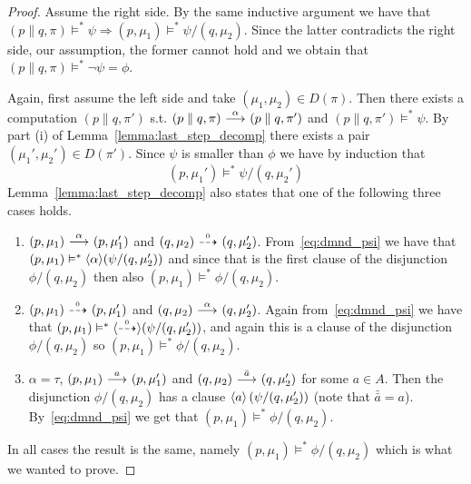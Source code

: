 \begin{proof}
    \rtl Assume the right side. By the same inductive argument we have that
    $(p \parallel q, \pi) \vDash^* \psi \Rightarrow (p,\mu_1) \vDash^* \psi / (q,\mu_2)$.
    Since the latter contradicts the right side, our assumption, the former cannot hold
    and we obtain that $(p \parallel q, \pi) \vDash^* \neg\psi = \phi$.



    \ltr Again, first assume the left side and take $(\mu_1,\mu_2)\in D(\pi)$. Then
    there exists a computation $(p\parallel q, \pi')$ s.t. $(p\parallel q, \pi) \ {\stackrel{{\alpha}}{\longrightarrow}}\ 
    (p\parallel q, \pi')$ and $(p\parallel q, \pi') \vDash^* \psi$.
    By part (i) of
    Lemma~\ref{lemma:last_step_decomp} there exists a pair $(\mu_1',\mu_2')\in D(\pi')$.
    Since $\psi$ is smaller than $\phi$ we have by induction that
    \begin{equation}\label{eq:dmnd_psi}
        (p,\mu_1') \vDash^* \psi / (q,\mu_2')
    \end{equation}
    Lemma~\ref{lemma:last_step_decomp} also states that one of the following three cases holds.
    \begin{enumerate}
        \item $(p,\mu_1)\ {\stackrel{{\alpha}}{\longrightarrow}}\ (p,\mu_1')$ and $(q,\mu_2)\ {\stackrel{_{0}}{\dashrightarrow}}\ (q,\mu_2')$.
            From~\eqref{eq:dmnd_psi} we have that $(p,\mu_1) \vDash^*
            \mbox{\ensuremath{\langle \alpha \rangle}}(\psi/(q,\mu_2'))$ and since that is the first clause of the
            disjunction $\phi/(q,\mu_2)$ then also $(p,\mu_1) \vDash^* \phi/(q,\mu_2)$.
        \item $(p,\mu_1)\ {\stackrel{_{0}}{\dashrightarrow}}\ (p,\mu_1')$ and $(q,\mu_2)\ {\stackrel{{\alpha}}{\longrightarrow}}\ (q,\mu_2')$.
            Again from~\eqref{eq:dmnd_psi} we have that $(p,\mu_1) \vDash^*
            \mbox{\ensuremath{\langle\stackrel{_{0}}{\dashrightarrow}\rangle}}(\psi/(q,\mu_2'))$, and again this is a clause of the disjunction
            $\phi/(q,\mu_2)$ so $(p,\mu_1) \vDash^* \phi/(q,\mu_2)$.
        \item $\alpha = \tau$, $(p,\mu_1) \ {\stackrel{{a}}{\longrightarrow}}\  (p,\mu_1')$ and $(q,\mu_2)
            \ {\stackrel{{\bar{a}}}{\longrightarrow}}\  (q,\mu_2')$ for some $a\in A$. Then the disjunction
            $\phi/(q,\mu_2)$ has a clause $\mbox{\ensuremath{\langle a \rangle}}\left( \psi / (q,\mu_2') \right)$
            (note that $\bar{\bar{a}} = a$). By~\eqref{eq:dmnd_psi} we get that
            $(p,\mu_1) \vDash^* \phi / (q,\mu_2)$.
    \end{enumerate}
    In all cases the result is the same, namely $(p,\mu_1) \vDash^* \phi / (q,\mu_2)$
    which is what we wanted to prove.


\end{proof}
